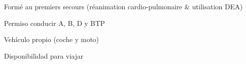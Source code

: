 
\begin{cvparagraph}
Formé au premiers secours (réanimation cardio-pulmonaire \& utilisation DEA)
\end{cvparagraph}

\begin{cvparagraph}
Permiso conducir A, B, D y BTP
\end{cvparagraph}

\begin{cvparagraph}
Vehículo propio (coche y moto)
\end{cvparagraph}

\begin{cvparagraph}
Disponibilidad para viajar
\end{cvparagraph}
